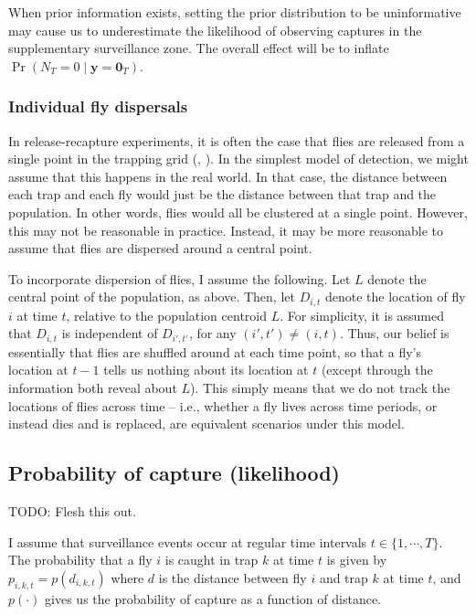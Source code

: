\documentclass[
]{book}
\begin{document}
When prior information exists, setting the prior distribution to be uninformative may cause us to underestimate the likelihood of observing captures in the supplementary surveillance zone. The overall effect will be to inflate \(\Pr(N_T = 0 \mid \mathbf y = \mathbf 0_T)\).

\hypertarget{individual-fly-dispersals}{%
\subsubsection{Individual fly dispersals}\label{individual-fly-dispersals}}

In release-recapture experiments, it is often the case that flies are released from a single point in the trapping grid (\citet{lg2004}, \citet{wong1982}). In the simplest model of detection, we might assume that this happens in the real world. In that case, the distance between each trap and each fly would just be the distance between that trap and the population. In other words, flies would all be clustered at a single point. However, this may not be reasonable in practice. Instead, it may be more reasonable to assume that flies are dispersed around a central point.

To incorporate dispersion of flies, I assume the following. Let \(L\) denote the central point of the population, as above. Then, let \(D_{i, t}\) denote the location of fly \(i\) at time \(t\), relative to the population centroid \(L\). For simplicity, it is assumed that \(D_{i, t}\) is independent of \(D_{i', t'}\), for any \((i', t') \neq (i, t)\). Thus, our belief is essentially that flies are shuffled around at each time point, so that a fly's location at \(t-1\) tells us nothing about its location at \(t\) (except through the information both reveal about \(L\)). This simply means that we do not track the locations of flies across time -- i.e., whether a fly lives across time periods, or instead dies and is replaced, are equivalent scenarios under this model.

\hypertarget{probability-of-capture-likelihood}{%
\subsection{Probability of capture (likelihood)}\label{probability-of-capture-likelihood}}

TODO: Flesh this out.

I assume that surveillance events occur at regular time intervals \(t \in \{1, \cdots, T\}\). The probability that a fly \(i\) is caught in trap \(k\) at time \(t\) is given by \(p_{i, k, t} = p(d_{i, k, t})\) where \(d\) is the distance between fly \(i\) and trap \(k\) at time \(t\), and \(p(\cdot)\) gives us the probability of capture as a function of distance.
\end{document}
